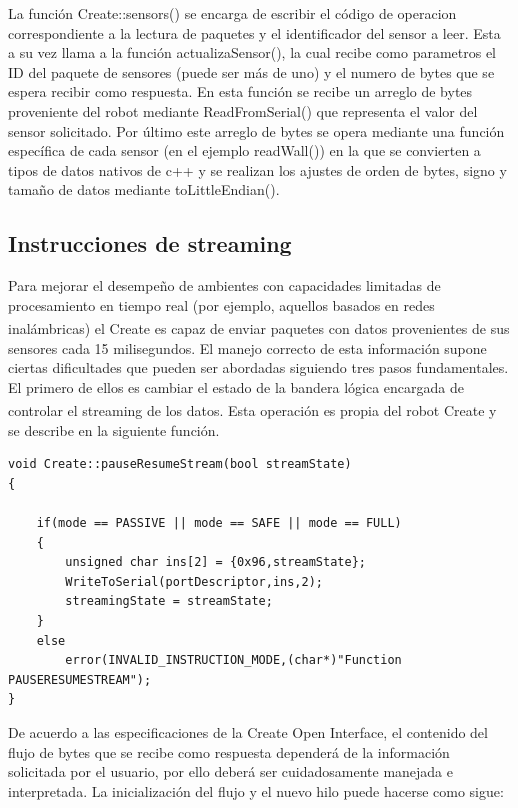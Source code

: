 \documentclass[letterpaper,openright,12pt]{book}
\begin{document}
La función Create::sensors() se encarga de escribir el código de operacion correspondiente  a la lectura de paquetes y el identificador del sensor a leer. Esta a su vez llama a la función actualizaSensor(), la cual recibe como parametros el ID del paquete de sensores (puede ser más de uno) y el numero de bytes que se espera recibir como respuesta. En esta función se recibe un arreglo de bytes proveniente del robot mediante ReadFromSerial() que representa el valor del sensor solicitado. Por último este arreglo de bytes se opera mediante una función específica de cada sensor (en el ejemplo readWall()) en la que se convierten a tipos de datos nativos de c++ y se realizan los ajustes de orden de bytes, signo y tamaño de datos mediante toLittleEndian().\\

\subsection{Instrucciones de streaming}
Para mejorar el desempeño de ambientes con capacidades limitadas de procesamiento en tiempo real (por ejemplo, aquellos basados en redes inalámbricas) el Create\textsuperscript{\textregistered} es capaz de enviar paquetes con datos provenientes de sus sensores cada 15 milisegundos. El manejo correcto de esta información supone ciertas dificultades que pueden ser abordadas siguiendo tres pasos fundamentales. El primero de ellos es cambiar el estado de la bandera lógica encargada de controlar el streaming de los datos. Esta operación es propia del robot Create\textsuperscript{\textregistered} y se describe en la siguiente función.\\
\begin{lstlisting}
void Create::pauseResumeStream(bool streamState)
{
	
	if(mode == PASSIVE || mode == SAFE || mode == FULL)
	{
		unsigned char ins[2] = {0x96,streamState};
		WriteToSerial(portDescriptor,ins,2);
		streamingState = streamState;
	}
	else
		error(INVALID_INSTRUCTION_MODE,(char*)"Function PAUSERESUMESTREAM");
}

\end{lstlisting}

De acuerdo a las especificaciones de la Create Open Interface, el contenido del flujo de bytes que se recibe como respuesta dependerá de la información solicitada por el usuario, por ello deberá ser cuidadosamente manejada e interpretada. La inicialización del flujo y el nuevo hilo puede hacerse como sigue:
\end{document}
